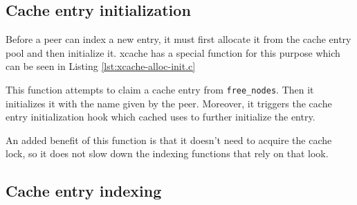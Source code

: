\begin{comment}
	The rest willwhaLet's start by listing what \texttt{xcache entry} 
	consists of.  First of all, it must have a name.  Since we preallocate 
	the entries and cannot know in runtime their length, we must allocate 
	as much space as possible. The \texttt{char name[XSEG\_MAX\_TARGETLEN + 
		1]} field, which is 256 characters long, is long enough to hold the 
	target's name.  Also, as we have mentioned in Section 
	\ref{sec:entry-prealloc-design}, xcache must be agnostic of the cache 
	contents.  To this end, we use the generic \texttt{void *priv} field as 
	a pointer to the actual entry content.  The rest of the fields will be 
	explained in the following chapters.

	Let's continue now with the fields of Listing \ref{lst:xcache-prealloc.h}.  
	Since we preallocate the entries using \texttt{malloc}, they take up a 
	contiguous space in memory.  The start of this space is the where the 
	\texttt{*nodes} field points to. The \texttt{free\_nodes} field works similarly 
	to the free\_entries field in Section \ref{sec:get-req-archip} i.e. it is a 
	stack where indexes to unused nodes are pushed. These indexes will be seen in 
	various code excerpts in this chapter and have a specific name, 
	\texttt{xcache\_handler}\footnote{\#define xcache\_handler uint64\_t}.
\end{comment}

\subsection{Cache entry initialization}

Before a peer can index a new entry, it must first allocate it from the cache 
entry pool and then initialize it. xcache has a special function for this 
purpose which can be seen in Listing \ref{lst:xcache-alloc-init.c}


This function attempts to claim a cache entry from \texttt{free\_nodes}. Then 
it initializes it with the name given by the peer. Moreover, it triggers the 
cache entry initialization hook which cached uses to further initialize the 
entry.

An added benefit of this function is that it doesn't need to acquire the cache 
lock, so it does not slow down the indexing functions that rely on that look.

\subsection{Cache entry indexing}

